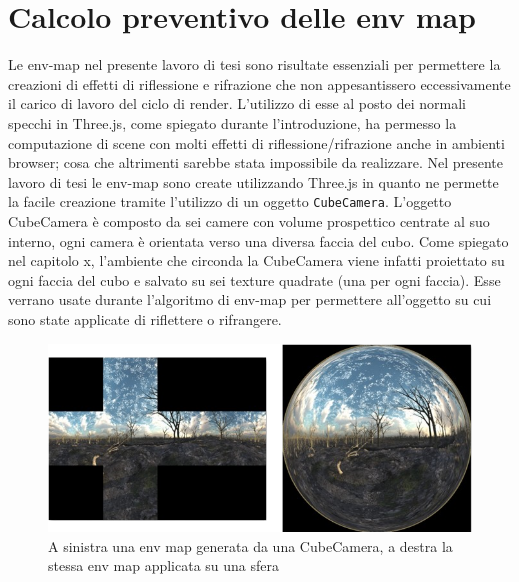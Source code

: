 \section{Calcolo preventivo delle env map}
\label{sec:chapter_lrl_calcolo_preventivo_env}

Le env-map nel presente lavoro di tesi sono risultate essenziali per permettere la creazioni di effetti di riflessione e rifrazione che non appesantissero eccessivamente il carico di lavoro del ciclo di render. 
L’utilizzo di esse al posto dei normali specchi in Three.js, come spiegato durante l’introduzione, ha permesso la computazione di scene con molti effetti di riflessione/rifrazione anche in ambienti browser; cosa che altrimenti sarebbe stata impossibile da realizzare.
Nel presente lavoro di tesi le env-map sono create utilizzando Three.js in quanto ne permette la facile creazione tramite l’utilizzo di un oggetto \texttt{CubeCamera}.
L’oggetto CubeCamera è composto da sei camere con volume prospettico centrate al suo interno, ogni camera è orientata verso una diversa faccia del cubo.
Come spiegato nel capitolo x, l’ambiente che circonda la CubeCamera viene infatti proiettato su ogni faccia del cubo e salvato su sei texture quadrate (una per ogni faccia). Esse verrano usate durante l’algoritmo di env-map per permettere all’oggetto su cui sono state applicate di riflettere o rifrangere.
\\
\begin{figure}[htb]
 \centering
 \includegraphics[width=1\linewidth]{images/chapter_lrl/lrl_envmapcubica.png}\hfill
 \caption[Env map di riflessione]{A sinistra una env map generata da una CubeCamera, a destra la stessa env map applicata su una sfera}
 \label{fig:lrl_envmapcubica}
\end{figure}

